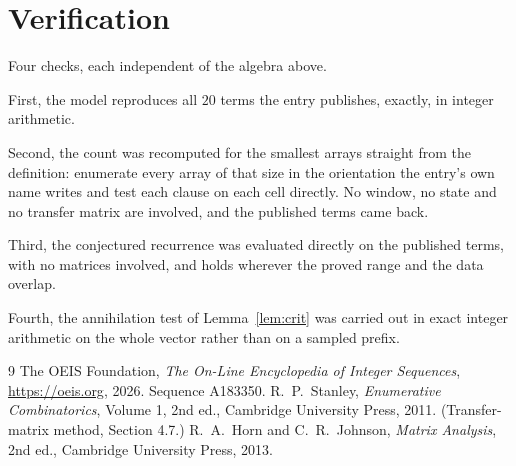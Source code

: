 \documentclass[11pt,a4paper]{article}
\theoremstyle{plain}
\theoremstyle{definition}
\begin{document}
\section{Verification}

Four checks, each independent of the algebra above.

First, the model reproduces all $20$ terms the entry publishes, exactly, in integer
arithmetic.

Second, the count was recomputed for the smallest arrays straight from the definition:
enumerate every array of that size in the orientation the entry's own name writes and test each
clause on each cell directly. No window, no state and no transfer matrix are involved, and the
published terms came back.

Third, the conjectured recurrence was evaluated directly on the published terms, with no
matrices involved, and holds wherever the proved range and the data overlap.

Fourth, the annihilation test of Lemma~\ref{lem:crit} was carried out in exact integer
arithmetic on the whole vector rather than on a sampled prefix.

\begin{thebibliography}{9}
 The OEIS Foundation, \emph{The On-Line Encyclopedia of Integer
Sequences}, \url{https://oeis.org}, 2026. Sequence A183350.
 R.~P.~Stanley, \emph{Enumerative Combinatorics}, Volume 1, 2nd ed.,
Cambridge University Press, 2011. (Transfer-matrix method, Section 4.7.)
 R.~A.~Horn and C.~R.~Johnson, \emph{Matrix Analysis}, 2nd ed., Cambridge
University Press, 2013.
\end{thebibliography}
\end{document}
